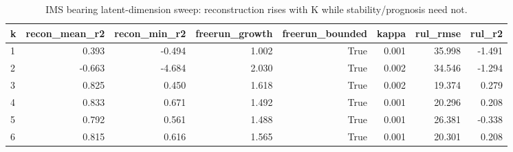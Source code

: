 \begin{table}[t]
\centering
\caption{IMS bearing latent-dimension sweep: reconstruction rises with K while stability/prognosis need not.}
\label{tab:ims_ksweep}
\begin{tabular}{lrrrrrrr}
\toprule
k & recon\_mean\_r2 & recon\_min\_r2 & freerun\_growth & freerun\_bounded & kappa & rul\_rmse & rul\_r2 \\
\midrule
1 & 0.393 & -0.494 & 1.002 & True & 0.001 & 35.998 & -1.491 \\
2 & -0.663 & -4.684 & 2.030 & True & 0.002 & 34.546 & -1.294 \\
3 & 0.825 & 0.450 & 1.618 & True & 0.002 & 19.374 & 0.279 \\
4 & 0.833 & 0.671 & 1.492 & True & 0.001 & 20.296 & 0.208 \\
5 & 0.792 & 0.561 & 1.488 & True & 0.001 & 26.381 & -0.338 \\
6 & 0.815 & 0.616 & 1.565 & True & 0.001 & 20.301 & 0.208 \\
\bottomrule
\end{tabular}
\end{table}